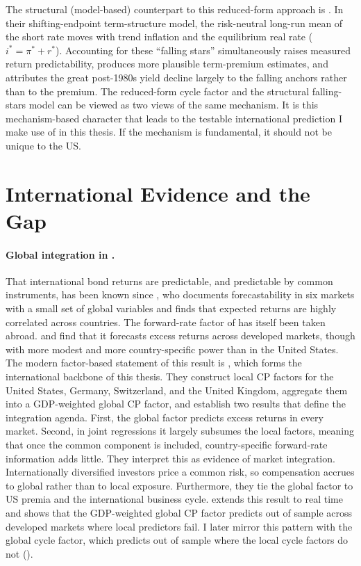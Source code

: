 The structural (model-based) counterpart to this reduced-form approach is
\citet{bauer2020}. In their shifting-endpoint term-structure model, the
risk-neutral long-run mean of the short rate moves with trend inflation
and the equilibrium real rate ($i^{*}=\pi^{*}+r^{*}$). Accounting for
these ``falling stars'' simultaneously raises measured return
predictability, produces more plausible term-premium estimates, and
attributes the great post-1980s yield decline largely to the falling
anchors rather than to the premium. The reduced-form cycle
factor and the structural falling-stars model can be viewed as two views of the same
mechanism. It is this mechanism-based
character that leads to the testable international prediction I make use of
in this thesis. If the mechanism is fundamental, it should not be unique to the US.

\section{International Evidence and the Gap}
\label{sec:lit-international}

\paragraph{Global integration in \citet{dahlquist2013}.}
\label{sec:lit-dh2013}

That international bond returns are predictable, and predictable by
common instruments, has been known since \citet{ilmanen1995}, who
documents forecastability in six markets with a small set of global
variables and finds that expected returns are highly correlated across
countries. The forward-rate factor of \citet{cochrane2005} has itself been
taken abroad. \citet{kessler2009} and \citet{sekkel2011} find that it
forecasts excess returns across developed markets, though with more modest
and more country-specific power than in the United States. The modern
factor-based statement of this result is \citet{dahlquist2013}, which forms
the international backbone of this thesis. They construct local CP factors for the United States, Germany,
Switzerland, and the United Kingdom, aggregate them into a GDP-weighted
global CP factor, and establish two results that define the
integration agenda. First, the global factor predicts excess returns in
every market. Second, in joint regressions it largely subsumes the local
factors, meaning that once the common component is included,
country-specific forward-rate information adds little. They interpret
this as evidence of market integration. Internationally diversified
investors price a common risk, so compensation accrues to global rather
than to local exposure. Furthermore, they tie the global factor to US
premia and the international business cycle. \citet{zhu2015} extends this
result to real time and shows that the GDP-weighted global CP factor
predicts out of sample across developed markets where local predictors
fail. I later mirror this pattern with the global cycle factor, which
predicts out of sample where the local cycle factors do not
().

